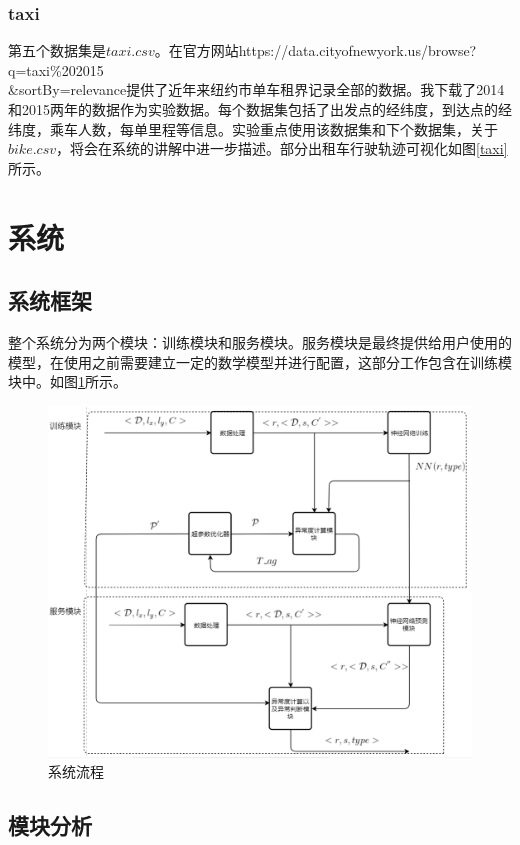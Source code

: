 \documentclass[a4paper, UTF8]{article}
\begin{document}
\begin{CJK}{UTF8}{gbsn}
\subsubsection*{taxi}
第五个数据集是$taxi.csv$。在官方网站https://data.cityofnewyork.us/browse?q=taxi\%202015 \\ \&sortBy=relevance提供了近年来纽约市单车租界记录全部的数据。我下载了2014和2015两年的数据作为实验数据。每个数据集包括了出发点的经纬度，到达点的经纬度，乘车人数，每单里程等信息。实验重点使用该数据集和下个数据集，关于$bike.csv$，将会在系统的讲解中进一步描述。部分出租车行驶轨迹可视化如图\ref{taxi}所示。
\section{系统}
\subsection{系统框架}
整个系统分为两个模块：训练模块和服务模块。服务模块是最终提供给用户使用的模型，在使用之前需要建立一定的数学模型并进行配置，这部分工作包含在训练模块中。如图\ref{system}所示。
\begin{figure}[ht]
\includegraphics[scale = 0.7]{system.png}
\centering
\caption{系统流程}
\label{system}
\end{figure}
\subsection{模块分析}

\end{CJK}
\end{document}
